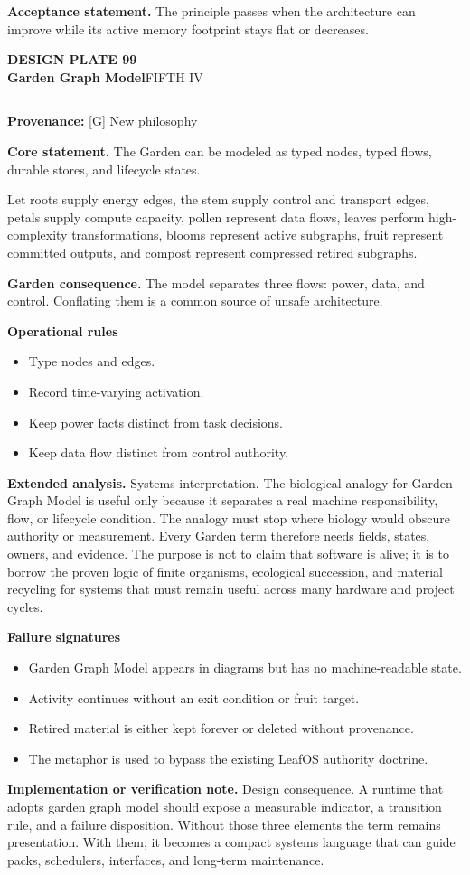 \documentclass[10pt,letterpaper,oneside]{article}
\newcommand{\prov}[1]{\textcolor{gardenBlue}{\sffamily\footnotesize\textbf{Provenance:} #1}}
\newcommand{\platetitle}[3]{%
  \begin{minipage}[t][0.54in][t]{\textwidth}
  {\sffamily\bfseries\color{gardenDeep}\fontsize{9}{10}\selectfont DESIGN PLATE #1}\\[-1pt]
  {\sffamily\bfseries\color{gardenInk}\fontsize{16.5}{18}\selectfont #2}\hfill{\sffamily\color{gardenGreen}\large #3}
  \end{minipage}\vspace{-2pt}\hrule\vspace{5pt}}
\begin{document}
\begin{acceptbox}
\textbf{Acceptance statement.} The principle passes when the architecture can improve while its active memory footprint stays flat or decreases.
\end{acceptbox}
\newpage
\platetitle{99}{Garden Graph Model}{FIFTH IV}
\prov{[G] New philosophy}
\fontsize{8.85}{10.45}\selectfont
\begin{corebox}
\textbf{Core statement.} The Garden can be modeled as typed nodes, typed flows, durable stores, and lifecycle states.
\end{corebox}
Let roots supply energy edges, the stem supply control and transport edges, petals supply compute capacity, pollen represent data flows, leaves perform high-complexity transformations, blooms represent active subgraphs, fruit represent committed outputs, and compost represent compressed retired subgraphs.

\textbf{Garden consequence.} The model separates three flows: power, data, and control. Conflating them is a common source of unsafe architecture.

\textbf{Operational rules}
\begin{itemize}
\item Type nodes and edges.
\item Record time-varying activation.
\item Keep power facts distinct from task decisions.
\item Keep data flow distinct from control authority.
\end{itemize}
\textbf{Extended analysis.} Systems interpretation. The biological analogy for Garden Graph Model is useful only because it separates a real machine responsibility, flow, or lifecycle condition. The analogy must stop where biology would obscure authority or measurement. Every Garden term therefore needs fields, states, owners, and evidence. The purpose is not to claim that software is alive; it is to borrow the proven logic of finite organisms, ecological succession, and material recycling for systems that must remain useful across many hardware and project cycles.

\textbf{Failure signatures}
\begin{itemize}
\item Garden Graph Model appears in diagrams but has no machine-readable state.
\item Activity continues without an exit condition or fruit target.
\item Retired material is either kept forever or deleted without provenance.
\item The metaphor is used to bypass the existing LeafOS authority doctrine.
\end{itemize}
\textbf{Implementation or verification note.} Design consequence. A runtime that adopts garden graph model should expose a measurable indicator, a transition rule, and a failure disposition. Without those three elements the term remains presentation. With them, it becomes a compact systems language that can guide packs, schedulers, interfaces, and long-term maintenance.
\end{document}
